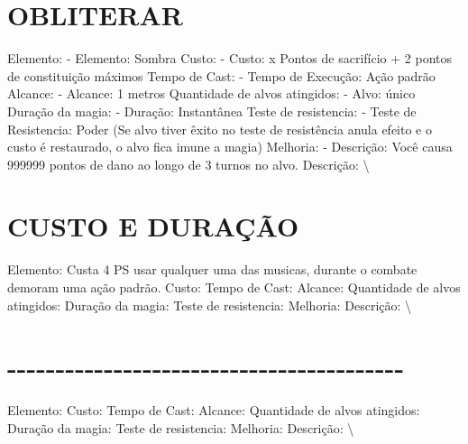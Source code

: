\documentclass{article}%
\begin{document}
\section{OBLITERAR}%
\label{sec:OBLITERAR}%
Elemento: {-} Elemento: Sombra\newline%
Custo: {-} Custo: x Pontos de sacrifício + 2 pontos de constituição máximos\newline%
Tempo de Cast: {-} Tempo de Execução: Ação padrão\newline%
Alcance: {-} Alcance: 1 metros\newline%
Quantidade de alvos atingidos: {-} Alvo: único\newline%
Duração da magia: {-} Duração: Instantânea\newline%
Teste de resistencia: {-} Teste de Resistencia: Poder (Se alvo tiver êxito no teste de resistência anula efeito e o custo é restaurado, o alvo fica imune a magia)\newline%
Melhoria: {-} Descrição: Você causa 999999 pontos de dano ao longo de 3 turnos no alvo.\newline%
Descrição: \textbackslash{}

%
\section{CUSTO E DURAÇÃO}%
\label{sec:CUSTOEDURAO}%
Elemento: Custa 4 PS usar qualquer uma das musicas, durante o combate demoram uma ação padrão.\newline%
Custo: \newline%
Tempo de Cast: \newline%
Alcance: \newline%
Quantidade de alvos atingidos: \newline%
Duração da magia: \newline%
Teste de resistencia: \newline%
Melhoria: \newline%
Descrição: \textbackslash{}

%
\section{{-}{-}{-}{-}{-}{-}{-}{-}{-}{-}{-}{-}{-}{-}{-}{-}{-}{-}{-}{-}{-}{-}{-}{-}{-}{-}{-}{-}{-}{-}{-}{-}{-}{-}{-}{-}{-}{-}{-}{-}{-}}%
\label{sec:{-}{-}{-}{-}{-}{-}{-}{-}{-}{-}{-}{-}{-}{-}{-}{-}{-}{-}{-}{-}{-}{-}{-}{-}{-}{-}{-}{-}{-}{-}{-}{-}{-}{-}{-}{-}{-}{-}{-}{-}{-}}%
Elemento: \newline%
Custo: \newline%
Tempo de Cast: \newline%
Alcance: \newline%
Quantidade de alvos atingidos: \newline%
Duração da magia: \newline%
Teste de resistencia: \newline%
Melhoria: \newline%
Descrição: \textbackslash{}
\end{document}
